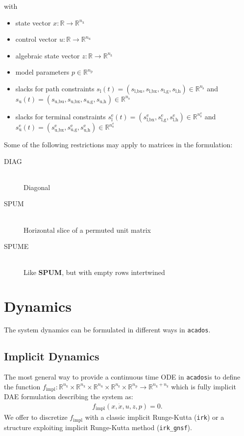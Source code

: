\documentclass{article}
\newcommand{\code}[1]{\texttt{#1}}
\newcommand{\acados}{\texttt{acados}}
\newcommand{\ind}[1]{_{\textrm{#1}}}
\newcommand{\terminal}{^{\textrm{e}}}
\newcommand{\Lower}{\ind{l}}
\newcommand{\lowerh}{\ind{l,h}}
\newcommand{\lowerbx}{\ind{l,bx}}
\newcommand{\lowerbu}{\ind{l,bu}}
\newcommand{\lowerg}{\ind{l,g}}
\newcommand{\upper}{\ind{u}}
\newcommand{\upperh}{\ind{u,h}}
\newcommand{\upperbx}{\ind{u,bx}}
\newcommand{\upperbu}{\ind{u,bu}}
\newcommand{\upperg}{\ind{u,g}}
\newcommand{\R}{\mathbb{R}}
\newcommand{\nx}{n\ind{x}}
\newcommand{\nuu}{n\ind{u}}
\newcommand{\nz}{n\ind{z}}
\newcommand{\np}{n\ind{p}}
\newcommand{\ns}{n\ind{s}}
\begin{document}
with
\begin{itemize}
\item state vector $ x: \R \rightarrow \R^{\nx} $
\item control vector $ u: \R \rightarrow \R^{\nuu} $
\item algebraic state vector $ z: \R \rightarrow \R^{\nz} $
\item model parameters $ p \in \R^{\np} $
\item slacks for path constraints $ s\Lower(t) = (s\lowerbu, s\lowerbx, s\lowerg, s\lowerh) \in \R^{\ns} $ and $ s\upper(t) = (s\upperbu, s\upperbx, s\upperg, s\upperh) \in \R^{\ns} $
\item slacks for terminal constraints $ s\Lower\terminal(t) = (s\lowerbx\terminal, s\lowerg\terminal, s\lowerh\terminal) \in \R^{\ns\terminal} $ and $ s\upper\terminal(t) = (s\upperbx\terminal, s\upperg\terminal, s\upperh\terminal) \in \R^{\ns\terminal} $
\end{itemize}

Some of the following restrictions may apply to matrices in the formulation:
\begin{description}
  \item[DIAG] \hfill \\ Diagonal
  \item[SPUM] \hfill \\ Horizontal slice of a permuted unit matrix
  \item[SPUME] \hfill \\ Like \textbf{SPUM}, but with empty rows intertwined
\end{description}


\section{Dynamics}
The system dynamics can be formulated in different ways in \acados.

\subsection*{Implicit Dynamics}
The most general way to provide a continuous time ODE in \acados is to define the function $ f\ind{impl}: \mathbb{R}^{\nx}\times\mathbb{R}^{\nx}\times\mathbb{R}^{\nuu}\times\mathbb{R}^{\nz}\times\mathbb{R}^{\np} \rightarrow \mathbb{R}^{\nx+\nz}$ which is fully implicit DAE formulation describing the system as:
\begin{align*}
	f\ind{impl}(x, \dot{x}, u, z, p) = 0.
\end{align*}
We offer to discretize $ f\ind{impl} $ with a classic implicit Runge-Kutta (\code{irk}) or a structure exploiting implicit Runge-Kutta method (\code{irk\_gnsf}).
\end{document}
